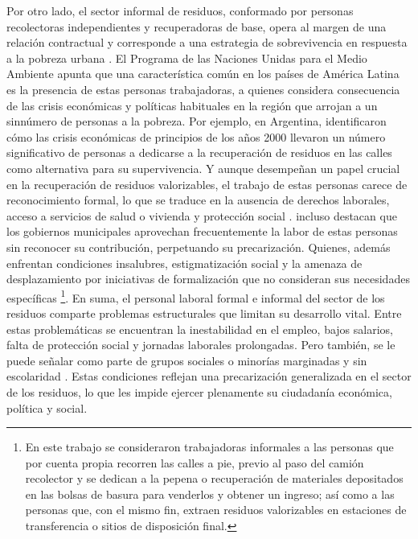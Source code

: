 \documentclass[
  spanish,
  11pt,
  a4paper,
]{scrbook}
\begin{document}
Por otro lado, el sector informal de residuos, conformado por personas
recolectoras independientes y recuperadoras de base, opera al margen de
una relación contractual y corresponde a una estrategia de sobrevivencia
en respuesta a la pobreza urbana \textcite{Tevera1993}. El Programa de
las Naciones Unidas para el Medio Ambiente
\autocite{ONUMedioAmbiente2018} apunta que una característica común en
los países de América Latina es la presencia de estas personas
trabajadoras, a quienes considera consecuencia de las crisis económicas
y políticas habituales en la región que arrojan a un sinnúmero de
personas a la pobreza. Por ejemplo, en Argentina,
\textcite{Perelman2010} identificaron cómo las crisis económicas de
principios de los años 2000 llevaron un número significativo de personas
a dedicarse a la recuperación de residuos en las calles como alternativa
para su supervivencia. Y aunque desempeñan un papel crucial en la
recuperación de residuos valorizables, el trabajo de estas personas
carece de reconocimiento formal, lo que se traduce en la ausencia de
derechos laborales, acceso a servicios de salud o vivienda y protección
social \autocite{Espinosa2013}. \textcite{Valente2019} incluso destacan
que los gobiernos municipales aprovechan frecuentemente la labor de
estas personas sin reconocer su contribución, perpetuando su
precarización. Quienes, además enfrentan condiciones insalubres,
estigmatización social y la amenaza de desplazamiento por iniciativas de
formalización que no consideran sus necesidades específicas
\autocite{Favela2013} \footnote{En este trabajo se consideraron
  trabajadoras informales a las personas que por cuenta propia recorren
  las calles a pie, previo al paso del camión recolector y se dedican a
  la pepena o recuperación de materiales depositados en las bolsas de
  basura para venderlos y obtener un ingreso; así como a las personas
  que, con el mismo fin, extraen residuos valorizables en estaciones de
  transferencia o sitios de disposición final.}. En suma, el personal
laboral formal e informal del sector de los residuos comparte problemas
estructurales que limitan su desarrollo vital. Entre estas problemáticas
se encuentran la inestabilidad en el empleo, bajos salarios, falta de
protección social y jornadas laborales prolongadas. Pero también, se le
puede señalar como parte de grupos sociales o minorías marginadas y sin
escolaridad \autocite{Besiou2011}. Estas condiciones reflejan una
precarización generalizada en el sector de los residuos, lo que les
impide ejercer plenamente su ciudadanía económica, política y social.
\end{document}
